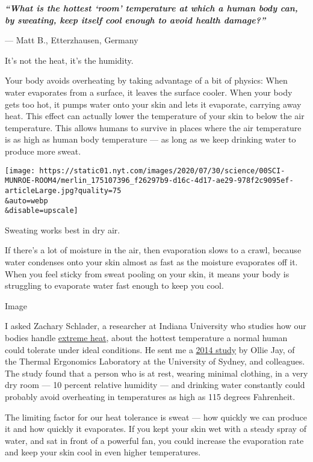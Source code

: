 \emph{\textbf{``What is the hottest `room' temperature at which a human
body can, by sweating, keep itself cool enough to avoid health
damage?''}}

--- Matt B., Etterzhausen, Germany

It's not the heat, it's the humidity.

Your body avoids overheating by taking advantage of a bit of physics:
When water evaporates from a surface, it leaves the surface cooler. When
your body gets too hot, it pumps water onto your skin and lets it
evaporate, carrying away heat. This effect can actually lower the
temperature of your skin to below the air temperature. This allows
humans to survive in places where the air temperature is as high as
human body temperature --- as long as we keep drinking water to produce
more sweat.

\texttt{[image: https://static01.nyt.com/images/2020/07/30/science/00SCI-MUNROE-ROOM4/merlin\_175107396\_f26297b9-d16c-4d17-ae29-978f2c9095ef-articleLarge.jpg?quality=75\\\&auto=webp\\\&disable=upscale]}

Sweating works best in dry air.

If there's a lot of moisture in the air, then evaporation slows to a
crawl, because water condenses onto your skin almost as fast as the
moisture evaporates off it. When you feel sticky from sweat pooling on
your skin, it means your body is struggling to evaporate water fast
enough to keep you cool.

Image

I asked Zachary Schlader, a researcher at Indiana University who studies
how our bodies handle
\href{https://journals.physiology.org/doi/abs/10.1152/ajpregu.00018.2020}{extreme
heat}, about the hottest temperature a normal human could tolerate under
ideal conditions. He sent me a
\href{https://www.sciencedirect.com/science/article/abs/pii/S0003687014001355}{2014
study} by Ollie Jay, of the Thermal Ergonomics Laboratory at the
University of Sydney, and colleagues. The study found that a person who
is at rest, wearing minimal clothing, in a very dry room --- 10 percent
relative humidity --- and drinking water constantly could probably avoid
overheating in temperatures as high as 115 degrees Fahrenheit.

The limiting factor for our heat tolerance is sweat --- how quickly we
can produce it and how quickly it evaporates. If you kept your skin wet
with a steady spray of water, and sat in front of a powerful fan, you
could increase the evaporation rate and keep your skin cool in even
higher temperatures.

